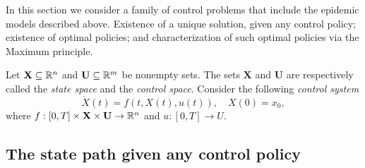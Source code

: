 \rm 




In this section we consider a family of control problems that include the epidemic models described above.  Existence of a unique solution, given any control policy; existence of optimal policies; and characterization of such optimal policies via the Maximum principle.

Let $\mathbf{X}\subseteq\mathbb{R}^n$ and $\mathbf{U}\subseteq \mathbb{R}^m$ be nonempty sets. The sets $\mathbf{X}$ and $\mathbf{U}$ are 
respectively called the {\it state space} and the {\it control space}. Consider 
the following {\it control system}
\begin{equation}\label{CoDiffEq}
\dot{X}(t)=f(t,X(t),u(t)), \quad X(0)=x_0,
\end{equation}
where $f:[0,T]\times \mathbf{X}\times \mathbf{U}\to \mathbb{R}^n$ and $u:[0,T]\to U$. 



\subsection{The state path given any control policy}




